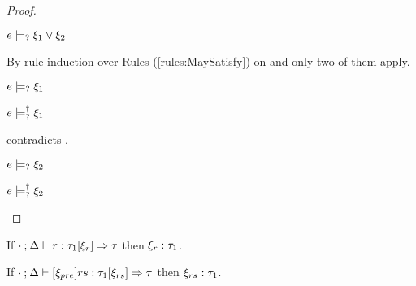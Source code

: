 \begin{proof}
\begin{byCases}
  \item[\text{(\ref{rule:CSMSMay})}]
    \begin{pfsteps*}
    \item $e \models_{?} \xi_1 \vee \xi_2$  
    \end{pfsteps*}
    By rule induction over Rules (\ref{rules:MaySatisfy}) on  and only two of them apply.
    \begin{byCases}

    \item[\text{(\ref{rule:CMSOr1})}]
      \begin{pfsteps*}
      \item $e \models_{?} \xi_1$  
      \item $e \models_{?}^{\dag} \xi_1$  
      \end{pfsteps*}
       contradicts .

    \item[\text{(\ref{rule:CMSOr2})}]
      \begin{pfsteps*}
      \item $e \models_{?} \xi_2$  
      \item $e \models_{?}^{\dag} \xi_2$ 
      \end{pfsteps*}
    \end{byCases}
    \resetpfcounter
  \end{byCases}
\end{proof}

\begin{lem}
  \label{lem:rule-constraint-typ}
  If $\cdot \mathbin{;} \Delta \vdash r : \tau_1 [\xi_r] \Rightarrow \tau$ then $\xi_r : \tau_1$.
\end{lem}

\begin{lem}
  \label{lem:rules-constraint-typ}
  If $\cdot \mathbin{;} \Delta \vdash [\xi_{pre}] rs : \tau_1 [\xi_{rs}] \Rightarrow \tau$ then $\xi_{rs} : \tau_1$.
\end{lem}

